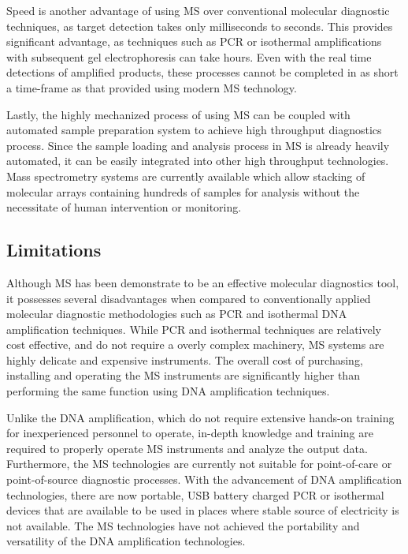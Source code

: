 \documentclass[letterpaper, 10 pt, conference]{ieeeconf}  %
\begin{document}
Speed is another advantage of using MS over conventional molecular diagnostic techniques, as target detection takes only milliseconds to seconds. This provides significant advantage, as techniques such as PCR or isothermal amplifications with subsequent gel electrophoresis can take hours. Even with the real time detections of amplified products, these processes cannot be completed in as short a time-frame as that provided using modern MS technology.

Lastly, the highly mechanized process of using MS can be coupled with automated sample preparation system to achieve high throughput diagnostics process. Since the sample loading and analysis process in MS is already heavily automated, it can be easily integrated into other high throughput technologies. Mass spectrometry systems are currently available which allow stacking of molecular arrays containing hundreds of samples for analysis without the necessitate of human intervention or monitoring.

        \subsection[\textbf{Limitations}]{\textbf{Limitations\autocite{R1}}}

Although MS has been demonstrate to be an effective molecular diagnostics tool, it possesses several disadvantages when compared to conventionally applied molecular diagnostic methodologies such as PCR and isothermal DNA amplification techniques. 
While PCR and isothermal techniques are relatively cost effective, and do not require a overly complex machinery, MS systems are highly delicate and expensive instruments. The overall cost of purchasing, installing and operating the MS instruments are significantly higher than performing the same function using DNA amplification techniques.

Unlike the DNA amplification, which do not require extensive hands-on training for inexperienced personnel to operate, in-depth knowledge and training are required to properly operate MS instruments and analyze the output data. Furthermore, the MS technologies are currently not suitable for point-of-care or point-of-source diagnostic processes. With the advancement of DNA amplification technologies, there are now portable, USB battery charged PCR or isothermal devices that are available to be used in places where stable source of electricity is not available. The MS technologies have not achieved the portability and versatility of the DNA amplification technologies.\autocite{R11}
\end{document}
